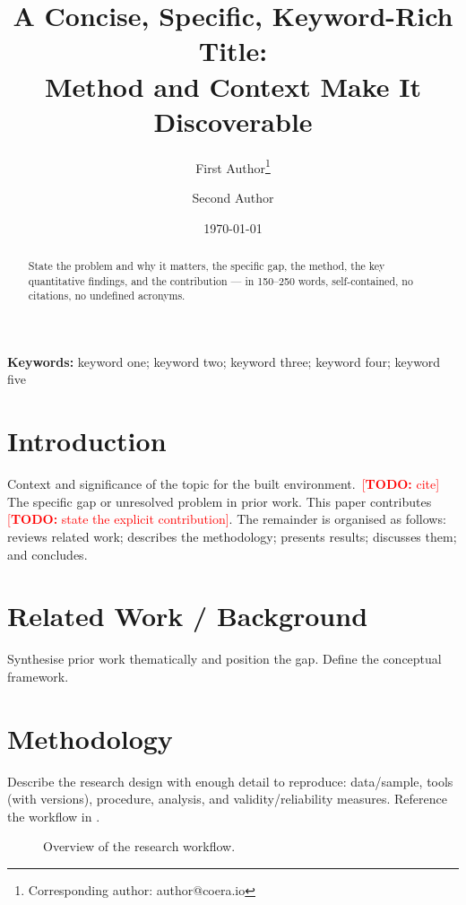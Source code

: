 \documentclass[11pt,a4paper]{article}
\title{A Concise, Specific, Keyword-Rich Title:\\ Method and Context Make It Discoverable}
\author{First Author\thanks{Corresponding author: author@coera.io} \and Second Author}
\date{\today}
\newcommand{\todo}[1]{\textcolor{red}{[\textbf{TODO:} #1]}}
\begin{document}
\maketitle

\begin{abstract}
\noindent
State the problem and why it matters, the specific gap, the method, the key quantitative findings,
and the contribution — in 150--250 words, self-contained, no citations, no undefined acronyms.
\end{abstract}

\noindent\textbf{Keywords:} keyword one; keyword two; keyword three; keyword four; keyword five

\section{Introduction}\label{sec:intro}
Context and significance of the topic for the built environment.\ \todo{cite}
The specific gap or unresolved problem in prior work.
This paper contributes \todo{state the explicit contribution}.
The remainder is organised as follows:  reviews related work; 
describes the methodology;  presents results;  discusses them;
and  concludes.

\section{Related Work / Background}\label{sec:related}
Synthesise prior work thematically and position the gap. Define the conceptual framework.

\section{Methodology}\label{sec:method}
Describe the research design with enough detail to reproduce: data/sample, tools (with versions),
procedure, analysis, and validity/reliability measures. Reference the workflow in .

\begin{figure}[t]
  \centering
  \caption{Overview of the research workflow.}
  \label{fig:workflow}
\end{figure}
\end{document}

